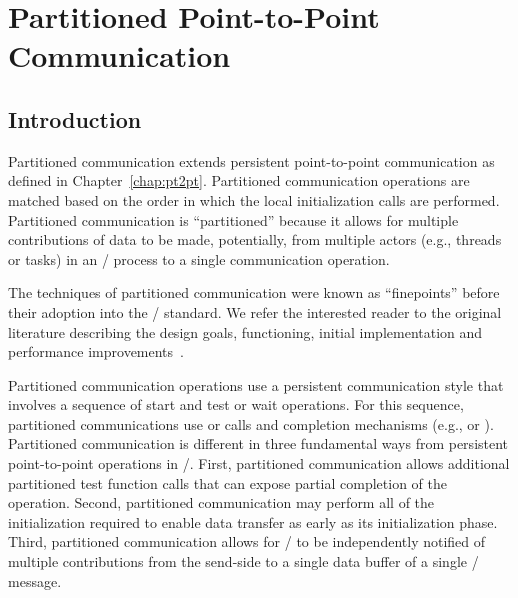 \chapter{Partitioned Point-to-Point Communication}
\label{sec:part}
\label{chap:part}

\section{Introduction}
\label{sec:part-intro}
Partitioned communication extends persistent point-to-point communication as  defined in
Chapter~\ref{chap:pt2pt}. Partitioned communication operations are matched based on the order in which the local initialization calls are performed. Partitioned
communication is ``partitioned'' because it allows for multiple contributions of
data to be made, potentially, from multiple actors (e.g., threads or tasks) in an \MPI/ process to a single communication
operation.

\begin{users}
The techniques of partitioned communication were known as ``finepoints'' 
before their adoption into the \MPI/ standard. 
We refer the interested reader to the original literature describing the
design goals, functioning, initial implementation 
and performance improvements~\cite{finepoints_isc,finepoints}.
\end{users}

Partitioned communication operations use
a persistent communication style that involves a sequence of start and test or wait operations. For this
sequence, partitioned communications use  or  calls
and completion mechanisms (e.g.,  or ).
Partitioned communication is different in three fundamental ways from persistent
point-to-point operations in \MPI/. 
First, partitioned communication
allows additional partitioned test function calls that can expose partial completion
of the operation.
Second, partitioned communication may perform all
of the initialization required to enable data transfer as
early as its initialization phase. Third, partitioned communication allows for
\MPI/ to be independently notified of multiple contributions from the 
send-side to a single data buffer of a single \MPI/ message.

